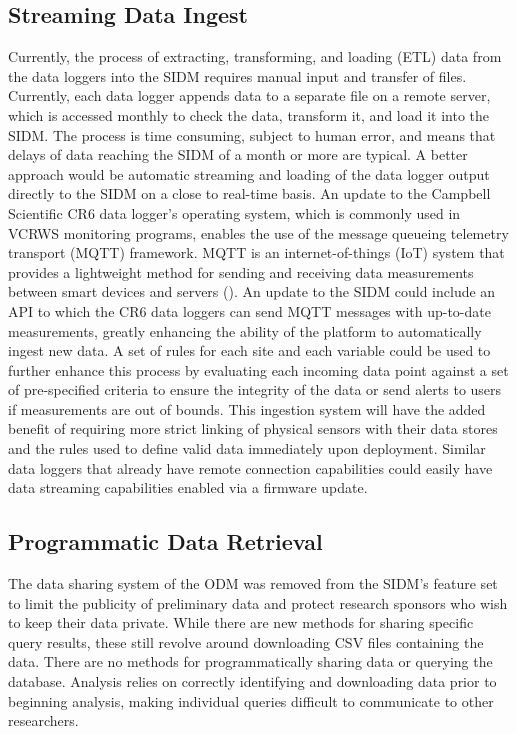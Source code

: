 \subsection{Streaming Data Ingest}
Currently, the process of extracting, transforming, and loading (ETL) data from the data loggers into the SIDM requires manual input and transfer of files.
Currently, each data logger appends data to a separate file on a remote server, which is accessed monthly to check the data, transform it, and load it into the SIDM.
The process is time consuming, subject to human error, and means that delays of data reaching the SIDM of a month or more are typical.
A better approach would be automatic streaming and loading of the data logger output directly to the SIDM on a close to real-time basis.
An update to the Campbell Scientific CR6 data logger's operating system, which is commonly used in VCRWS monitoring programs, enables the use of the message queueing telemetry transport (MQTT) framework.
MQTT is an internet-of-things (IoT) system that provides a lightweight method for sending and receiving data measurements between smart devices and servers (\cite{MQTT}).
An update to the SIDM could include an API to which the CR6 data loggers can send MQTT messages with up-to-date measurements, greatly enhancing the ability of the platform to automatically ingest new data.
A set of rules for each site and each variable could be used to further enhance this process by evaluating each incoming data point against a set of pre-specified criteria to ensure the integrity of the data or send alerts to users if measurements are out of bounds.
This ingestion system will have the added benefit of requiring more strict linking of physical sensors with their data stores and the rules used to define valid data immediately upon deployment.
Similar data loggers that already have remote connection capabilities could easily have data streaming capabilities enabled via a firmware update.

\subsection{Programmatic Data Retrieval}
The data sharing system of the ODM was removed from the SIDM's feature set to limit the publicity of preliminary data and protect research sponsors who wish to keep their data private.
While there are new methods for sharing specific query results, these still revolve around downloading CSV files containing the data.
There are no methods for programmatically sharing data or querying the database.
Analysis relies on correctly identifying and downloading data prior to beginning analysis, making individual queries difficult to communicate to other researchers.

